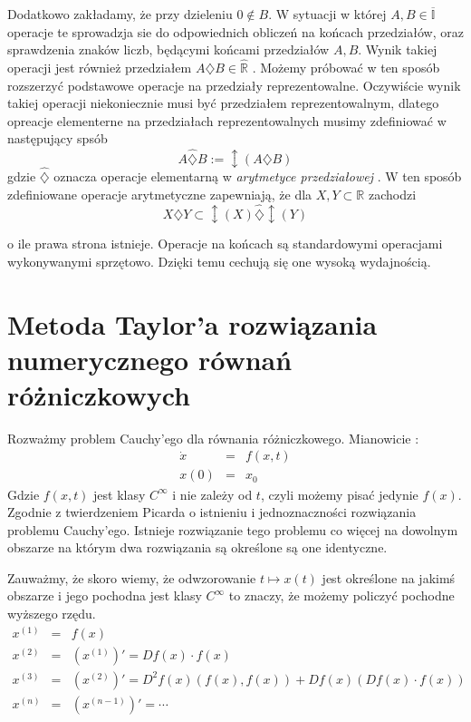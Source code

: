  Dodatkowo zakładamy, że przy dzieleniu $0 \notin B $. W sytuacji w której $ A,B \in \overline{ \mathbb I } $ operacje te sprowadzja 
 sie do odpowiednich obliczeń na końcach przedziałów, oraz sprawdzenia znaków liczb, będącymi końcami przedziałów $ A,B $.
 Wynik takiej operacji jest również przedziałem $ A \diamondsuit B \in \hat {\mathbb R } $ .
 Możemy próbować w ten sposób rozszerzyć podstawowe operacje na przedziały reprezentowalne. Oczywiście wynik takiej operacji
 niekoniecznie musi być przedziałem reprezentowalnym, dlatego opreacje elementerne na przedziałach reprezentowalnych musimy zdefiniować w
 następujący spsób 
 \begin{equation}
    A \hat{\diamondsuit} B := \updownarrow (A \diamondsuit B ) 
 \end{equation}
 gdzie $ \hat { \diamondsuit } $ oznacza operacje elementarną w {\em arytmetyce przedziałowej }. 
 W ten sposób zdefiniowane operacje arytmetyczne zapewniają, że dla $ X,Y \subset \mathbb R $ zachodzi
 \begin{equation}
    X \diamondsuit Y \subset \updownarrow(X) \hat{\diamondsuit} \updownarrow(Y)
 \end{equation}
 
 o ile prawa strona istnieje. 
 Operacje na końcach są standardowymi operacjami wykonywanymi sprzętowo. Dzięki temu cechują się one 
 wysoką wydajnością. 
 
 \section{Metoda Taylor'a rozwiązania numerycznego równań różniczkowych}
 Rozważmy problem Cauchy'ego dla równania różniczkowego. Mianowicie :
 \begin{eqnarray*}
    \dot x & = & f(x,t) \\
    x(0) & = & x_0
 \end{eqnarray*}
 Gdzie $ f(x,t) $ jest klasy $ C^{ \infty } $ i nie zależy od $ t $, czyli możemy pisać jedynie $ f(x) $.
 Zgodnie z twierdzeniem Picarda o istnieniu i jednoznaczności rozwiązania problemu Cauchy'ego. Istnieje rozwiązanie tego problemu co więcej
 na dowolnym obszarze na którym dwa rozwiązania są określone są one identyczne.
 
 Zauważmy, że skoro wiemy, że odwzorowanie $ t \mapsto x(t) $ jest określone na jakimś obszarze i jego pochodna jest klasy $ C^{ \infty } $ to znaczy,
 że możemy policzyć pochodne wyższego rzędu.
\begin{eqnarray*}
    x^{(1)} & = & f(x) \\
    x^{(2)} & = & (x^{(1)})' = Df(x) \cdot f(x) \\
    x^{(3)} & = & (x^{(2)})' = D^2f(x) (f(x),f(x)) + Df(x)(Df(x) \cdot f(x)) \\
    x^{(n)} & = & (x^{(n-1)})' = \cdots
\end{eqnarray*}

